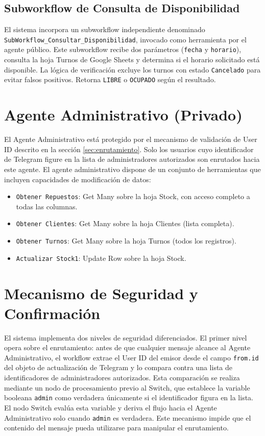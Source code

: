 \documentclass[12pt,a4paper]{report}
\begin{document}
\subsection{Subworkflow de Consulta de Disponibilidad}

El sistema incorpora un subworkflow independiente denominado \texttt{SubWorkflow\_Consultar\_Disponibilidad}, invocado como herramienta por el agente público. Este subworkflow recibe dos parámetros (\texttt{fecha} y \texttt{horario}), consulta la hoja Turnos de Google Sheets y determina si el horario solicitado está disponible. La lógica de verificación excluye los turnos con estado \texttt{Cancelado} para evitar falsos positivos. Retorna \texttt{LIBRE} o \texttt{OCUPADO} según el resultado.

\section{Agente Administrativo (Privado)}

El Agente Administrativo está protegido por el mecanismo de validación de User ID descrito en la sección \ref{sec:enrutamiento}. Solo los usuarios cuyo identificador de Telegram figure en la lista de administradores autorizados son enrutados hacia este agente. El agente administrativo dispone de un conjunto de herramientas que incluyen capacidades de modificación de datos:

\begin{itemize}
  \item \texttt{Obtener Repuestos}: Get Many sobre la hoja Stock, con acceso completo a todas las columnas.
  \item \texttt{Obtener Clientes}: Get Many sobre la hoja Clientes (lista completa).
  \item \texttt{Obtener Turnos}: Get Many sobre la hoja Turnos (todos los registros).
  \item \texttt{Actualizar Stock1}: Update Row sobre la hoja Stock.
\end{itemize}

\section{Mecanismo de Seguridad y Confirmación}

El sistema implementa dos niveles de seguridad diferenciados. El primer nivel opera sobre el enrutamiento: antes de que cualquier mensaje alcance al Agente Administrativo, el workflow extrae el User ID del emisor desde el campo \texttt{from.id} del objeto de actualización de Telegram y lo compara contra una lista de identificadores de administradores autorizados. Esta comparación se realiza mediante un nodo de procesamiento previo al Switch, que establece la variable booleana \texttt{admin} como verdadera únicamente si el identificador figura en la lista. El nodo Switch evalúa esta variable y deriva el flujo hacia el Agente Administrativo solo cuando \texttt{admin} es verdadera. Este mecanismo impide que el contenido del mensaje pueda utilizarse para manipular el enrutamiento.
\end{document}
